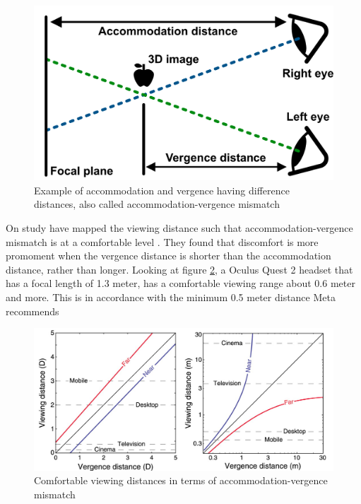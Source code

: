 \documentclass[screen, sigcconf]{timtm}
\begin{document}
\begin{figure}[h]
  \includegraphics[width=\linewidth]{figures/AccommodationVergenceConflict.png}
  \caption{Example of accommodation and vergence having difference distances, also called accommodation-vergence mismatch}
  \label{fig:accommodation_vergence_conflict}
\end{figure}

On study have mapped the viewing distance such that accommodation-vergence mismatch is at a comfortable level \cite{shibata_zone_2011}. They found that discomfort is more promoment when the vergence distance is shorter than the accommodation distance, rather than longer. Looking at figure \ref{fig:comfort_viewing_diagram}, a Oculus Quest 2 headset that has a focal length of 1.3 meter, has a comfortable viewing range about 0.6 meter and more. This is in accordance with the minimum 0.5 meter distance Meta recommends \cite{noauthor_vision_nodate}

\begin{figure}[h]
  \includegraphics[width=\linewidth]{figures/ComfortViewingDiagram.png}
  \caption{Comfortable viewing distances in terms of accommodation-vergence mismatch}
  \label{fig:comfort_viewing_diagram}
\end{figure}
\end{document}
